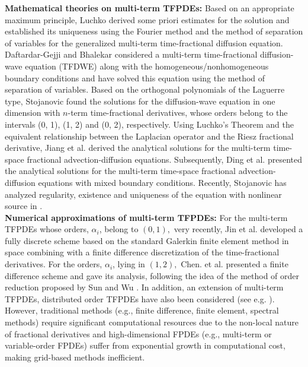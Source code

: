 \documentclass[11pt]{article}
\providecommand{\bh}[1]{#1}
\begin{document}
    \bh{ {\bf Mathematical theories  on multi-term TFPDEs:}
 Based on an appropriate maximum principle, Luchko \cite{Luchko-2011} derived some priori
estimates for the solution and established its uniqueness using the Fourier
method and the method of separation of variables for the generalized multi-term time-fractional diffusion equation. Daftardar-Gejji and Bhalekar \cite{Daftardar-Gejji2008} considered a multi-term
time-fractional diffusion-wave equation (TFDWE) along with the homogeneous/nonhomogeneous boundary
conditions and have  solved this equation  using the method of separation of variables. Based
on the orthogonal polynomials of the Laguerre type, Stojanovic \cite{Stojanovic2011} found the solutions for the
diffusion-wave equation in one dimension with $n$-term time-fractional derivatives, whose orders
belong to the intervals (0, 1), (1, 2) and (0, 2), respectively. Using Luchko's Theorem and the
equivalent relationship between the Laplacian operator and the Riesz fractional derivative, Jiang
et al. \cite{Jiang2012} derived the analytical solutions for the multi-term time-space fractional advection-diffusion
equations. Subsequently, Ding et al. \cite{Ding2013} presented the analytical solutions
for the multi-term time-space fractional advection-diffusion equations with mixed boundary
conditions. Recently, Stojanovic has  analyzed regularity,  existence and uniqueness of the equation with nonlinear source  in  \cite{Stojanovic2013}.}\\
\bh{{\bf Numerical approximations of multi-term TFPDEs:}  For the multi-term TFPDEs  whose orders, $\alpha_i$, belong to $(0,1),$ very recently, Jin et al. \cite{Jin2015} developed a fully discrete scheme based  on the standard Galerkin
finite element method in space  combining with a finite difference discretization of the time-fractional derivatives.   For the orders, $\alpha_i$, lying in  $(1,2),$ Chen. et al.  \cite{Chen-Liu2012} presented a finite difference scheme and gave its analysis, following the idea of the method of order reduction  proposed by Sun and Wu \cite{Sun2006}. In addition, an extension of multi-term TFPDEs, distributed order TFPDEs have also been considered (see e.g.  \cite{Ye2014,Morgado2014}). However, traditional methods (e.g., finite difference, finite element, spectral methods) require significant computational resources due to the non-local nature of fractional derivatives and high-dimensional FPDEs (e.g., multi-term or variable-order FPDEs) suffer from exponential growth in computational cost, making grid-based methods inefficient.} \\
\end{document}
